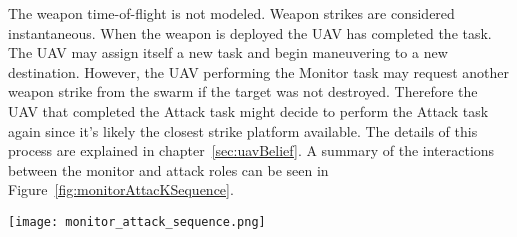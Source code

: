 The weapon time-of-flight is not modeled.  Weapon strikes are considered instantaneous.  When the weapon is deployed the UAV has completed the task.  The UAV may assign itself a new task and begin maneuvering to a new destination.  However, the UAV performing the Monitor task may request another weapon strike from the swarm if the target was not destroyed.  Therefore the UAV that completed the Attack task might decide to perform the Attack task again since it's likely the closest strike platform available.  The details of this process are explained in chapter~\ref{sec:uavBelief}.  A summary of the interactions between the monitor and attack roles can be seen in Figure~\ref{fig:monitorAttacKSequence}.



\begin{figure*}%
	\centering
	\texttt{[image: monitor\_attack\_sequence.png]}
	\caption{Monitor and Attack Sequence Interactions}
	\label{fig:monitorAttacKSequence}
\end{figure*}


	
